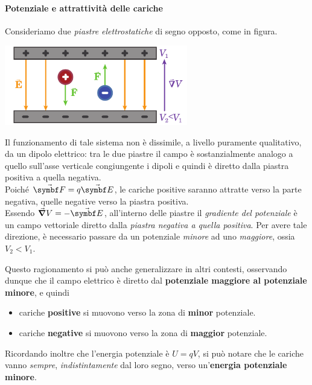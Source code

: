\paragraph{Potenziale e attrattività delle cariche}%
\begin{examplewt}
	Consideriamo due \textit{piastre elettrostatiche} di segno opposto, come in figura.
	\begin{center}
		\includegraphics[width=0.6\textwidth]{images/chp3/chp3armature.pdf}
	\end{center}
	Il funzionamento di tale sistema non è dissimile, a livello puramente qualitativo, da un dipolo elettrico: tra le due piastre il campo è sostanzialmente analogo a quello sull'asse verticale congiungente i dipoli e quindi è diretto dalla piastra positiva a quella negativa.\\
	Poiché $\vba{F}=q\vba{E}$, le cariche positive saranno attratte verso la parte negativa, quelle negative verso la piastra positiva.\\
	Essendo $\grad{V}=-\vba{E}$, all'interno delle piastre il \textit{gradiente del potenziale} è un campo vettoriale diretto dalla \textit{piastra negativa a quella positiva}. Per avere tale direzione, è necessario passare da un potenziale \textit{minore} ad uno \textit{maggiore}, ossia $V_2<V_1$.
\end{examplewt}
Questo ragionamento si può anche generalizzare in altri contesti, osservando dunque che il campo elettrico è diretto dal \textbf{potenziale maggiore al potenziale minore}, e quindi
\begin{itemize}
	\item cariche \textbf{positive} si muovono verso la zona di \textbf{minor} potenziale.
	\item cariche \textbf{negative} si muovono verso la zona di \textbf{maggior} potenziale.
\end{itemize}
Ricordando inoltre che l'energia potenziale è $U=qV$, si può notare che le cariche vanno \textit{sempre}, \textit{indistintamente} dal loro segno, verso un'\textbf{energia potenziale minore}.
